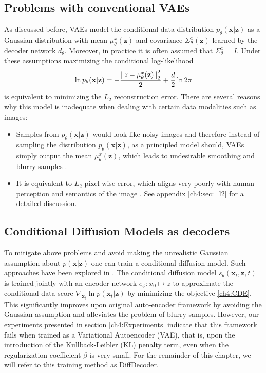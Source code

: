 \subsection{Problems with conventional VAEs}
As discussed before, VAEs model the conditional data distribution $p_\theta (\textbf{x}| \textbf{z})$ as a Gaussian distribution with mean $\mu^x_\theta( \textbf{z})$ and covariance $\Sigma^x_\theta( \textbf{z})$ learned by the decoder network $d_\theta$. Moreover, in practice it is often assumed that $\Sigma^x_\theta = I$. Under these assumptions maximizing the conditional log-likelihood $$\ln p_\theta (\textbf{x} | \textbf{z}) = -\frac{\left\lVert z - \mu^x_\theta( \textbf{z}) \right\rVert_2^2}{2} + \frac{d}{2}\ln{2\pi}$$ is equivalent to minimizing the $L_2$ reconstruction error. There are several reasons why this model is inadequate when dealing with certain data modalities such as images:
\begin{itemize}
    \item Samples from $p_\theta(\textbf{x} | \textbf{z})$ would look like noisy images and therefore instead of sampling the distribution $p_\theta(\textbf{x}| \textbf{z})$, as a principled model should, VAEs simply output the mean $\mu^x_\theta( \textbf{z})$, which leads to undesirable smoothing and blurry samples \cite{zaho2017understanding_vaes}.
    \item It is equivalent to $L_2$ pixel-wise error, which aligns very poorly with human perception and semantics of the image \cite{zhang2018lpips}. See appendix  \ref{ch4:sec:_l2} for a detailed discussion.
\end{itemize}

\subsection{Conditional Diffusion Models as decoders}
To mitigate above problems and avoid making the unrealistic Gaussian assumption about $p(\textbf{x}| \textbf{z})$ one can train a conditional diffusion model. Such approaches have been explored in \cite{preechakul2022diffusion_decoder, yang2023ldiffusion_decoder_compression}. The conditional diffusion model $s_\theta(\textbf{x}_t, \textbf{z},t)$ is trained jointly with an encoder network $e_\phi : x_0 \mapsto z$ to approximate the conditional data score $\nabla_{\textbf{x}_t}  \ln{p(\textbf{x}_t | \textbf{z})}$ by minimizing the objective \ref{ch4:CDE}. This significantly improves upon original auto-encoder framework by avoiding the Gaussian assumption and alleviates the problem of blurry samples. However, our experiments presented in section \ref{ch4:Experiments} indicate that this framework fails when trained as a Variational Autoencoder (VAE), that is, upon the introduction of the Kullback-Leibler (KL) penalty term, even when the regularization coefficient $\beta$ is very small. For the remainder of this chapter, we will refer to this training method as DiffDecoder.

